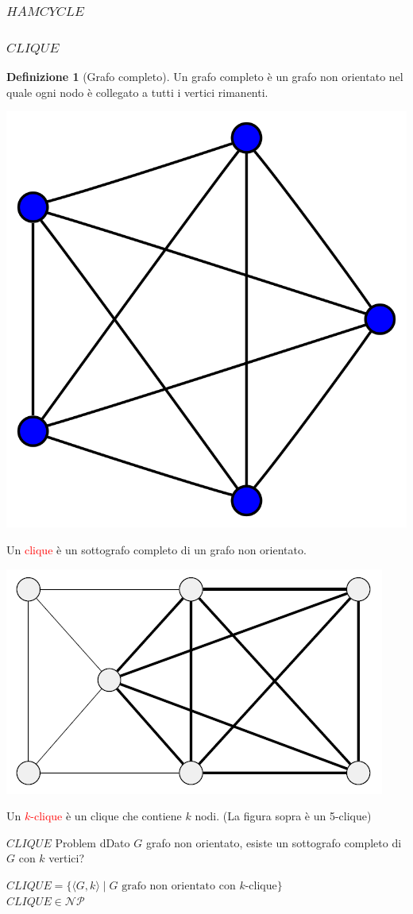 \documentclass{article}  %
\theoremstyle{definition}
\newtheorem{definition}{Definizione}[section]
\begin{document}
\subsubsection{$HAMCYCLE$}

\subsubsection{$CLIQUE$}
\begin{definition}[Grafo completo]
	Un grafo completo è un grafo non orientato nel quale ogni nodo è collegato a tutti i vertici rimanenti.
	\begin{center}
		\includegraphics[width=0.2\linewidth]{complete-graph.png}
	\end{center}
\end{definition}
Un \textcolor{red}{clique} è un sottografo completo di un grafo non orientato.
\begin{center}
	\includegraphics[width=0.3\linewidth]{clique.png}
\end{center}
Un \textcolor{red}{$k$-clique} è un clique che contiene $k$ nodi. (La figura sopra è un 5-clique)
\begin{theorem}{$CLIQUE$ Problem}
	dDato $G$ grafo non orientato, esiste un sottografo completo di $G$ con $k$ vertici?
	\begin{center}
		$CLIQUE = \{\langle G,k \rangle \mid G \text{ grafo non orientato con } k\text{-clique}\}$ \\
		$CLIQUE \in \mathcal{NP}$
	\end{center}
	\footnotesize
\end{theorem}
\end{document}

